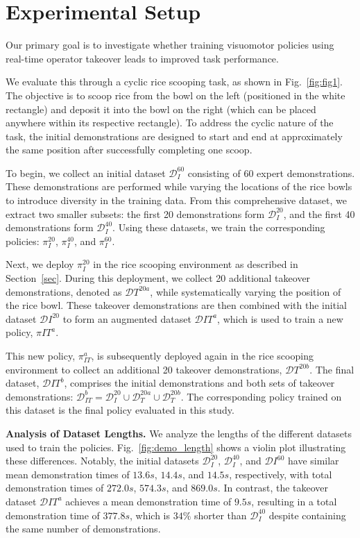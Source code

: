

\section{Experimental Setup} Our primary goal is to investigate whether training visuomotor policies using real-time operator takeover leads to improved task performance.

We evaluate this through a cyclic rice scooping task, as shown in Fig.~\ref{fig:fig1}. The objective is to scoop rice from the bowl on the left (positioned in the white rectangle) and deposit it into the bowl on the right (which can be placed anywhere within its respective rectangle). To address the cyclic nature of the task, the initial demonstrations are designed to start and end at approximately the same position after successfully completing one scoop.

To begin, we collect an initial dataset $\mathcal{D}_I^{60}$ consisting of 60 expert demonstrations. These demonstrations are performed while varying the locations of the rice bowls to introduce diversity in the training data. From this comprehensive dataset, we extract two smaller subsets: the first 20 demonstrations form $\mathcal{D}_I^{20}$, and the first 40 demonstrations form $\mathcal{D}_I^{40}$. Using these datasets, we train the corresponding policies: $\pi_I^{20}$, $\pi_I^{40}$, and $\pi_I^{60}$.

Next, we deploy $\pi_I^{20}$ in the rice scooping environment as described in Section~\ref{sec}. During this deployment, we collect 20 additional takeover demonstrations, denoted as $\mathcal{D}T^{20a}$, while systematically varying the position of the rice bowl. These takeover demonstrations are then combined with the initial dataset $\mathcal{D}I^{20}$ to form an augmented dataset $\mathcal{D}{IT}^{a}$, which is used to train a new policy, $\pi{IT}^{a}$.

This new policy, $\pi_{IT}^{a}$, is subsequently deployed again in the rice scooping environment to collect an additional 20 takeover demonstrations, $\mathcal{D}T^{20b}$. The final dataset, $\mathcal{D}{IT}^{b}$, comprises the initial demonstrations and both sets of takeover demonstrations: $\mathcal{D}_{IT}^{b} = \mathcal{D}_I^{20} \cup \mathcal{D}_T^{20a} \cup \mathcal{D}_T^{20b}$. The corresponding policy trained on this dataset is the final policy evaluated in this study.

\textbf{Analysis of Dataset Lengths.}
We analyze the lengths of the different datasets used to train the policies. Fig.~\ref{fig:demo_length} shows a violin plot illustrating these differences. Notably, the initial datasets $\mathcal{D}_I^{20}$, $\mathcal{D}_I^{40}$, and $\mathcal{D}I^{60}$ have similar mean demonstration times of $13.6s$, $14.4s$, and $14.5s$, respectively, with total demonstration times of $272.0s$, $574.3s$, and $869.0s$. In contrast, the takeover dataset $\mathcal{D}{IT}^{a}$ achieves a mean demonstration time of $9.5s$, resulting in a total demonstration time of $377.8s$, which is $34\%$ shorter than $\mathcal{D}_I^{40}$ despite containing the same number of demonstrations.

